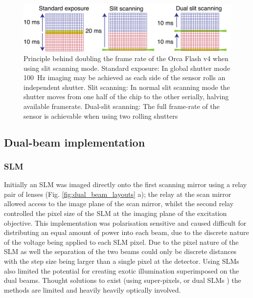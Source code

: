 \begin{figure}
  \centering
  \includegraphics{dual_slit_scanning}
  \caption{
  Principle behind doubling the frame rate of the Orca Flash v4 when using slit scanning mode.
  Standard exposure: In global shutter mode \SI{100}{\hertz} imaging may be achieved as each side of the sensor rolls an independent shutter.
  Slit scanning: In normal slit scanning mode the shutter moves from one half of the chip to the other serially, halving available framerate.
  Dual-slit scanning:
  The full frame-rate of the sensor is achievable when using two rolling shutters
  }
  \label{fig:dual_slit_scanning}
\end{figure}

\subsection{Dual-beam implementation}
\subsubsection{SLM}
Initially an SLM was imaged directly onto the first scanning mirror using a relay pair of lenses (Fig. \ref{fig:dual_beam_layouts} a); the relay at the scan mirror allowed access to the image plane of the scan mirror, whilst the second relay controlled the pixel size of the SLM at the imaging plane of the excitation objective.
This implementation was polarisation sensitive and caused difficult for distributing an equal amount of power into each beam, due to the discrete nature of the voltage being applied to each SLM pixel.
Due to the pixel nature of the SLM as well the separation of the two beams could only be discrete distances with the step size being larger than a single pixel at the detector.
Using SLMs also limited the potential for creating exotic illumination superimposed on the dual beams.
Thought solutions to exist (using super-pixels\cite{}, or dual SLMs \cite{}) the methods are limited and heavily heavily optically involved.

